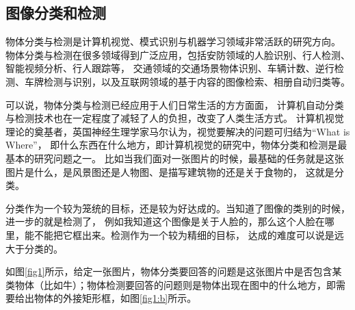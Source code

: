 \documentclass[UTF8,a4paper,10pt,nocolorlinks]{ctexart}
\begin{document}
\begin{multicols}{2}
    \section{图像分类和检测}
        物体分类与检测是计算机视觉、模式识别与机器学习领域非常活跃的研究方向。
        物体分类与检测在很多领域得到广泛应用，包括安防领域的人脸识别、行人检测、智能视频分析、行人跟踪等，
        交通领域的交通场景物体识别、车辆计数、逆行检测、车牌检测与识别，以及互联网领域的基于内容的图像检索、相册自动归类等。
        \par 可以说，物体分类与检测已经应用于人们日常生活的方方面面，
        计算机自动分类与检测技术也在一定程度了减轻了人的负担，改变了人类生活方式。
        计算机视觉理论的奠基者，英国神经生理学家马尔认为，视觉要解决的问题可归结为“What is Where”，
        即什么东西在什么地方，即计算机视觉的研究中，物体分类和检测是最基本的研究问题之一。
        比如当我们面对一张图片的时候，最基础的任务就是这张图片是什么，是风景图还是人物图、是描写建筑物的还是关于食物的，
        这就是分类。\par
        分类作为一个较为笼统的目标，还是较为好达成的。当知道了图像的类别的时候，进一步的就是检测了，
        例如我知道这个图像是关于人脸的，那么这个人脸在哪里，能不能把它框出来。检测作为一个较为精细的目标，
        达成的难度可以说是远大于分类的。
    \par 如图\ref{fig1}所示，给定一张图片，物体分类要回答的问题是这张图片中是否包含某类物体（比如牛）；物体检测要回答的问题则是物体出现在图中的什么地方，即需要给出物体的外接矩形框，如图\ref{fig1:b}所示。
        \begin{figure}[htpb]
            \centering
\end{figure}
\end{multicols}
\end{document}
